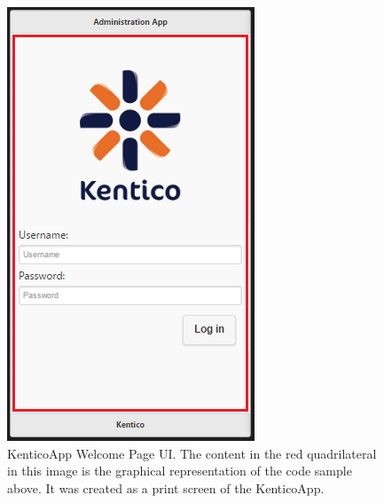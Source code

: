 \begin{figure}
  \includegraphics[width=\textwidth/2]{Images/WelcomePageIllistration.png}
  \caption{KenticoApp Welcome Page UI. The content in the red quadrilateral in this image is the graphical representation of the code sample above. It was created as a print screen of the KenticoApp.}
  \label{WelcomePageIllustration}
\end{figure}
